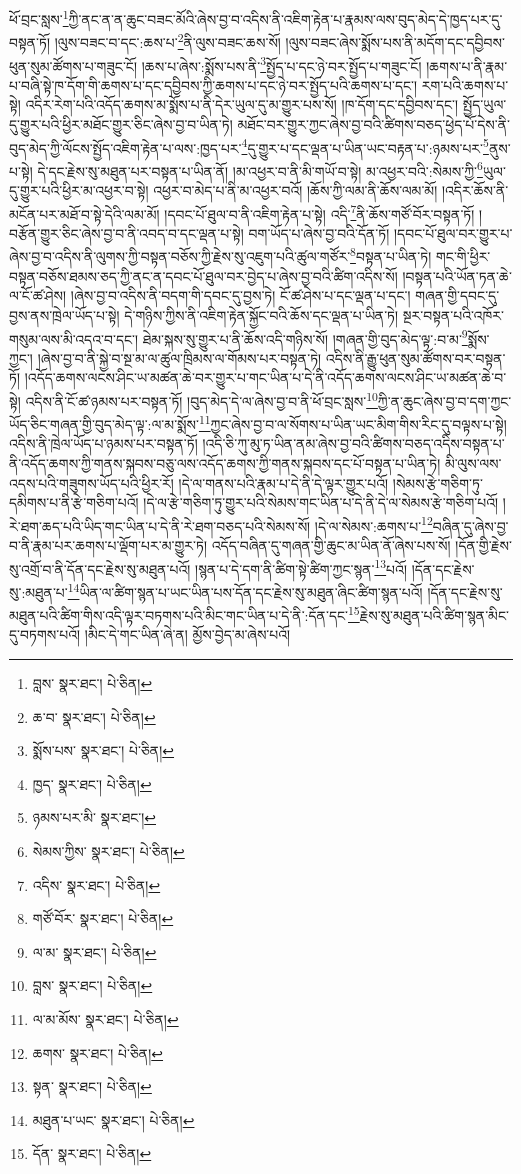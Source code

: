 ཕོ་བྲང་སླས་\footnote{བླས་  སྣར་ཐང་།  པེ་ཅིན། }ཀྱི་ནང་ན་ན་ཆུང་བཟང་མོའི་ཞེས་བྱ་བ་འདིས་ནི་འཇིག་རྟེན་པ་རྣམས་ལས་བུད་མེད་དེ་ཁྱད་པར་དུ་བསྟན་ཏོ། །ལུས་བཟང་བ་དང་:ཆས་པ་\footnote{ཆ་བ་  སྣར་ཐང་།  པེ་ཅིན། }ནི་ལུས་བཟང་ཆས་སོ། །ལུས་བཟང་ཞེས་སྨོས་པས་ནི་མདོག་དང་དབྱིབས་ཕུན་སུམ་ཚོགས་པ་གཟུང་ངོ། །ཆས་པ་ཞེས་:སྨོས་པས་ནི་\footnote{སྨོས་པས་  སྣར་ཐང་།  པེ་ཅིན། }སྤྱོད་པ་དང་ཉེ་བར་སྤྱོད་པ་གཟུང་ངོ། །ཆགས་པ་ནི་རྣམ་པ་བཞི་སྟེ་ཁ་དོག་གི་ཆགས་པ་དང་དབྱིབས་ཀྱི་ཆགས་པ་དང་ཉེ་བར་སྤྱོད་པའི་ཆགས་པ་དང་། རག་པའི་ཆགས་པ་སྟེ། འདིར་རེག་པའི་འདོད་ཆགས་མ་སྨོས་པ་ནི་དེར་ཡུལ་དུ་མ་གྱུར་པས་སོ། །ཁ་དོག་དང་དབྱིབས་དང་། སྤྱོད་ཡུལ་དུ་གྱུར་པའི་ཕྱིར་མཐོང་གྱུར་ཅིང་ཞེས་བྱ་བ་ཡིན་ཏེ། མཐོང་བར་གྱུར་ཀྱང་ཞེས་བྱ་བའི་ཚིགས་བཅད་ཕྱེད་པོ་དེས་ནི་བུད་མེད་ཀྱི་ལོངས་སྤྱོད་འཇིག་རྟེན་པ་ལས་:ཁྱད་པར་\footnote{ཁྱད་  སྣར་ཐང་།  པེ་ཅིན། }དུ་གྱུར་པ་དང་ལྡན་པ་ཡིན་ཡང་བརྟན་པ་:ཉམས་པར་\footnote{ཉམས་པར་མི་  སྣར་ཐང་། }ནུས་པ་སྟེ། དེ་དང་རྗེས་སུ་མཐུན་པར་བསྟན་པ་ཡིན་ནོ། །མ་འཕྱར་བ་ནི་མི་གཡོ་བ་སྟེ། མ་འཕྱར་བའི་:སེམས་ཀྱི་\footnote{སེམས་ཀྱིས་  སྣར་ཐང་།  པེ་ཅིན། }ཡུལ་དུ་གྱུར་པའི་ཕྱིར་མ་འཕྱར་བ་སྟེ། འཕྱར་བ་མེད་པ་ནི་མ་འཕྱར་བའོ། །ཆོས་ཀྱི་ལམ་ནི་ཆོས་ལམ་མོ། །འདིར་ཆོས་ནི་མངོན་པར་མཐོ་བ་སྟེ་དེའི་ལམ་མོ། །དབང་པོ་ཐུལ་བ་ནི་འཇིག་རྟེན་པ་སྟེ། འདི་\footnote{འདིས་  སྣར་ཐང་།  པེ་ཅིན། }ནི་ཆོས་གཙོ་བོར་བསྟན་ཏོ། །བརྩོན་གྱུར་ཅིང་ཞེས་བྱ་བ་ནི་འབད་བ་དང་ལྡན་པ་སྟེ། བག་ཡོད་པ་ཞེས་བྱ་བའི་དོན་ཏོ། །དབང་པོ་ཐུལ་བར་གྱུར་པ་ཞེས་བྱ་བ་འདིས་ནི་ལུགས་ཀྱི་བསྟན་བཅོས་ཀྱི་རྗེས་སུ་འཇུག་པའི་ཚུལ་གཙོར་\footnote{གཙོ་བོར་  སྣར་ཐང་།  པེ་ཅིན། }བསྟན་པ་ཡིན་ཏེ། གང་གི་ཕྱིར་བསྟན་བཅོས་ཐམས་ཅད་ཀྱི་ནང་ན་དབང་པོ་ཐུལ་བར་བྱེད་པ་ཞེས་བྱ་བའི་ཚིག་འདིས་སོ། །བསྟན་པའི་ཡོན་ཏན་ཆེ་ལ་ངོ་ཚ་ཤེས། །ཞེས་བྱ་བ་འདིས་ནི་བདག་གི་དབང་དུ་བྱས་ཏེ། ངོ་ཚ་ཤེས་པ་དང་ལྡན་པ་དང་། གཞན་གྱི་དབང་དུ་བྱས་ནས་ཁྲེལ་ཡོད་པ་སྟེ། དེ་གཉིས་ཀྱིས་ནི་འཇིག་རྟེན་སྐྱོང་བའི་ཆོས་དང་ལྡན་པ་ཡིན་ཏེ། སྔར་བསྟན་པའི་འཁོར་གསུམ་ལས་མི་འདའ་བ་དང་། ཐེམ་སྐས་སུ་གྱུར་པ་ནི་ཆོས་འདི་གཉིས་སོ། །གཞན་གྱི་བུད་མེད་ལྟ་:བ་མ་\footnote{ལ་མ་  སྣར་ཐང་།  པེ་ཅིན། }སྨོས་ཀྱང་། །ཞེས་བྱ་བ་ནི་སྐྱེ་བ་སྔ་མ་ལ་ཚུལ་ཁྲིམས་ལ་གོམས་པར་བསྟན་ཏེ། འདིས་ནི་རྒྱུ་ཕུན་སུམ་ཚོགས་བར་བསྟན་ཏོ། །འདོད་ཆགས་ལངས་ཤིང་ཡ་མཚན་ཆེ་བར་གྱུར་པ་གང་ཡིན་པ་དེ་ནི་འདོད་ཆགས་ལངས་ཤིང་ཡ་མཚན་ཆེ་བ་སྟེ། འདིས་ནི་ངོ་ཚ་ཉམས་པར་བསྟན་ཏོ། །བུད་མེད་དེ་ལ་ཞེས་བྱ་བ་ནི་ཕོ་བྲང་སླས་\footnote{བླས་  སྣར་ཐང་།  པེ་ཅིན། }ཀྱི་ན་ཆུང་ཞེས་བྱ་བ་དག་ཀྱང་ཡོད་ཅིང་གཞན་གྱི་བུད་མེད་ལྟ་:ལ་མ་སྨོས་\footnote{ལ་མ་མོས་  སྣར་ཐང་།  པེ་ཅིན། }ཀྱང་ཞེས་བྱ་བ་ལ་སོགས་པ་ཡིན་ཡང་མིག་གིས་རིང་དུ་བལྟས་པ་སྟེ། འདིས་ནི་ཁྲེལ་ཡོད་པ་ཉམས་པར་བསྟན་ཏོ། །འདི་ཅི་ཀུ་མུ་ཏ་ཡིན་ནམ་ཞེས་བྱ་བའི་ཚིགས་བཅད་འདིས་བསྟན་པ་ནི་འདོད་ཆགས་ཀྱི་གནས་སྐབས་བཅུ་ལས་འདོད་ཆགས་ཀྱི་གནས་སྐབས་དང་པོ་བསྟན་པ་ཡིན་ཏེ། མི་ལུས་ལས་འདས་པའི་གཟུགས་ཡོད་པའི་ཕྱིར་རོ། །དེ་ལ་གནས་པའི་རྣམ་པ་དེ་ནི་དེ་ལྟར་གྱུར་པའོ། །སེམས་རྩེ་གཅིག་ཏུ་དམིགས་པ་ནི་རྩེ་གཅིག་པའོ། །དེ་ལ་རྩེ་གཅིག་ཏུ་གྱུར་པའི་སེམས་གང་ཡིན་པ་དེ་ནི་དེ་ལ་སེམས་རྩེ་གཅིག་པའོ། །རེ་ཐག་ཆད་པའི་ཡིད་གང་ཡིན་པ་དེ་ནི་རེ་ཐག་བཅད་པའི་སེམས་སོ། །དེ་ལ་སེམས་:ཆགས་པ་\footnote{ཆགས་  སྣར་ཐང་།  པེ་ཅིན། }བཞིན་དུ་ཞེས་བྱ་བ་ནི་རྣམ་པར་ཆགས་པ་ལྡོག་པར་མ་གྱུར་ཏེ། འདོད་བཞིན་དུ་གཞན་གྱི་ཆུང་མ་ཡིན་ནོ་ཞེས་པས་སོ། །དོན་གྱི་རྗེས་སུ་འགྲོ་བ་ནི་དོན་དང་རྗེས་སུ་མཐུན་པའོ། །སྙན་པ་དེ་དག་ནི་ཚིག་སྟེ་ཚིག་ཀྱང་སྙན་\footnote{སྟན་  སྣར་ཐང་།  པེ་ཅིན། }པའོ། །དོན་དང་རྗེས་སུ་:མཐུན་པ་\footnote{མཐུན་པ་ཡང་  སྣར་ཐང་།  པེ་ཅིན། }ཡིན་ལ་ཚིག་སྙན་པ་ཡང་ཡིན་པས་དོན་དང་རྗེས་སུ་མཐུན་ཞིང་ཚིག་སྙན་པའོ། །དོན་དང་རྗེས་སུ་མཐུན་པའི་ཚིག་གིས་འདི་ལྟར་བཏགས་པའི་མིང་གང་ཡིན་པ་དེ་ནི་:དོན་དང་\footnote{དོན་  སྣར་ཐང་།  པེ་ཅིན། }རྗེས་སུ་མཐུན་པའི་ཚིག་སྙན་མིང་དུ་བཏགས་པའོ། །མིང་དེ་གང་ཡིན་ཞེ་ན། མྱོས་བྱེད་མ་ཞེས་པའོ། 